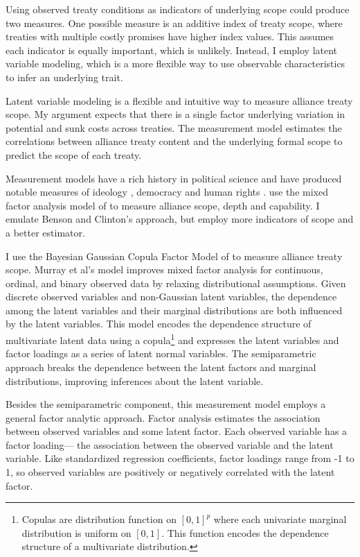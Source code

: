 \documentclass[12pt]{article}
\begin{document}
Using observed treaty conditions as indicators of underlying scope could produce two measures. 
One possible measure is an additive index of treaty scope, where treaties with multiple costly promises have higher index values. 
This assumes each indicator is equally important, which is unlikely. 
Instead, I employ latent variable modeling, which is a more flexible way to use observable characteristics to infer an underlying trait. 


Latent variable modeling is a flexible and intuitive way to measure alliance treaty scope. 
My argument expects that there is a single factor underlying variation in potential and sunk costs across treaties.  
The measurement model estimates the correlations between alliance treaty content and the underlying formal scope to predict the scope of each treaty. 


Measurement models have a rich history in political science and have produced notable measures of ideology \citep{Clintonetal2004}, democracy \citep{TreierJackman2008} and human rights \citep{Fariss2014}. 
\citet{BensonClinton2016} use the mixed factor analysis model of \citet{Quinn2004} to measure alliance scope, depth and capability.
I emulate Benson and Clinton's approach, but employ more indicators of scope and a better estimator. 


I use the Bayesian Gaussian Copula Factor Model of \citet{Murrayetal2013} to measure alliance treaty scope. 
Murray et al's model improves mixed factor analysis for continuous, ordinal, and binary observed data by relaxing distributional assumptions. 
Given discrete observed variables and non-Gaussian latent variables, the dependence among the latent variables and their marginal distributions are both influenced by the latent variables.
This model encodes the dependence structure of multivariate latent data using a copula\footnote{Copulas are distribution function on $[0, 1]^p$ where each univariate marginal distribution is uniform on $[0,1]$. This function encodes the dependence structure of a multivariate distribution.} and expresses the latent variables and factor loadings as a series of latent normal variables. 
The semiparametric approach breaks the dependence between the latent factors and marginal distributions, improving inferences about the latent variable. 


Besides the semiparametric component, this measurement model employs a general factor analytic approach.
Factor analysis estimates the association between observed variables and some latent factor.
Each observed variable has a factor loading--- the association between the observed variable and the latent variable.  
Like standardized regression coefficients, factor loadings range from -1 to 1, so observed variables are positively or negatively correlated with the latent factor.  
\end{document}
